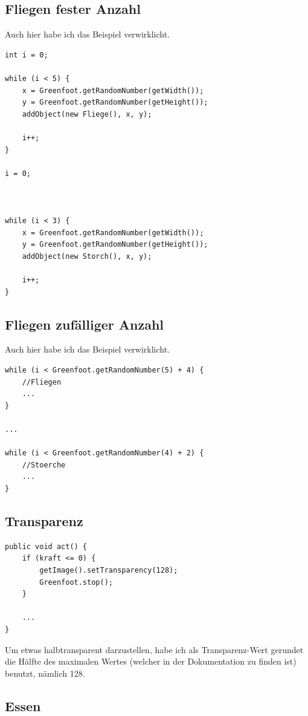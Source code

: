 \documentclass{scrartcl}   %
\begin{document}
\subsection{Fliegen fester Anzahl}

Auch hier habe ich das Beispiel verwirklicht.\\
\begin{lstlisting}
int i = 0;
        
while (i < 5) {
    x = Greenfoot.getRandomNumber(getWidth());
    y = Greenfoot.getRandomNumber(getHeight());
    addObject(new Fliege(), x, y);
    
    i++;
}

i = 0;



while (i < 3) {
    x = Greenfoot.getRandomNumber(getWidth());
    y = Greenfoot.getRandomNumber(getHeight());
    addObject(new Storch(), x, y);
    
    i++;
}
\end{lstlisting}

\subsection{Fliegen zufälliger Anzahl}

Auch hier habe ich das Beispiel verwirklicht.\\
\begin{lstlisting}
while (i < Greenfoot.getRandomNumber(5) + 4) {
    //Fliegen
    ...
}

...

while (i < Greenfoot.getRandomNumber(4) + 2) {
    //Stoerche
    ...
}
\end{lstlisting}

\subsection{Transparenz}

\begin{lstlisting}
public void act() {
    if (kraft <= 0) {
        getImage().setTransparency(128);
        Greenfoot.stop();
    }

    ...
}
\end{lstlisting}

Um etwas halbtransparent darzustellen, habe ich als Transparenz-Wert gerundet die Hälfte des maximalen Wertes (welcher in der Dokumentation zu finden ist) benutzt, nämlich 128.

\subsection{Essen}
\end{document}
